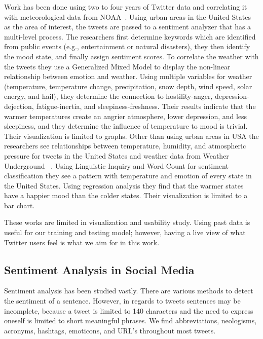 Work has been done using two to four years of Twitter data and correlating it with meteorological data from NOAA~\cite{hannak2012tweetin,li2014nasty}. Using urban areas in the United States as the area of interest, the tweets are passed to a sentiment analyzer that has a multi-level process. The researchers first determine keywords which are identified from public events (e.g., entertainment or natural disasters), they then identify the mood state, and finally assign sentiment scores. To correlate the weather with the tweets they use a Generalized Mixed Model to display the non-linear relationship between emotion and weather. Using multiple variables for weather (temperature, temperature change, precipitation, snow depth, wind speed, solar energy, and hail), they determine the connection to hostility-anger, depression-dejection, fatigue-inertia, and sleepiness-freshness. Their results indicate that the warmer temperatures create an angrier atmosphere, lower depression, and less sleepiness, and they determine the influence of temperature to mood is trivial. Their visualization is limited to graphs. Other than using urban areas in USA the researchers see relationships between temperature, humidity, and atmospheric pressure for tweets in the United States and weather data from Weather Underground ~\cite{park2013mood}. Using Linguistic Inquiry and Word Count for sentiment classification they see a pattern with temperature and emotion of every state in the United States. Using regression analysis they find that the warmer states have a happier mood than the colder states. Their visualization is limited to a bar chart.

These works are limited in visualization and usability study. Using past data is useful for our training and testing model; however, having a live view of what Twitter users feel is what we aim for in this work.


\subsection{Sentiment Analysis in Social Media}

Sentiment analysis has been studied vastly. There are various methods to detect the sentiment of a sentence. However, in regards to tweets sentences may be incomplete, because a tweet is limited to 140 characters and the need to express oneself is limited to short meaningful phrases. We find abbreviations, neologisms, acronyms, hashtags, emoticons, and URL's throughout most tweets.

